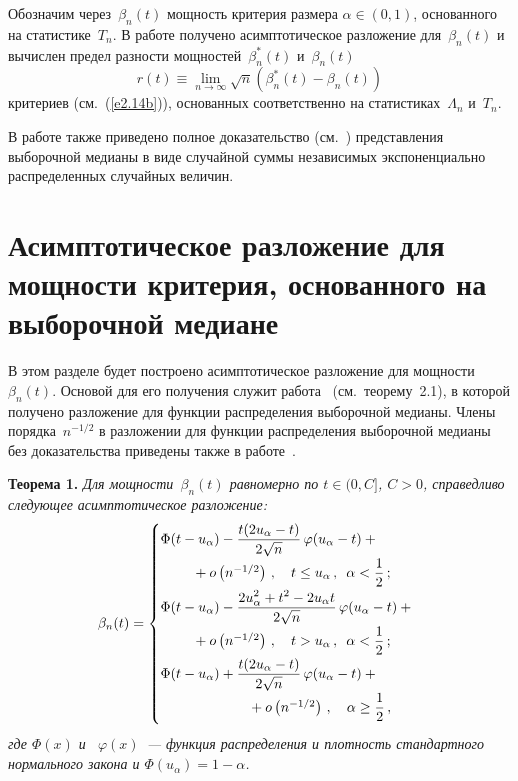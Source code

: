 \begin{multicols}{2}
Обозначим через~$\beta_n(t)$ мощность критерия размера $\alpha\in (0,1)$,
основанного на статистике~$T_n$. В работе получено асимптотическое
разложение для~$\beta_n(t)$ и вычислен предел разности мощностей~$\beta_n^*(t)$ и~$\beta_n(t)$
$$
r(t)\equiv\lim_{n\to\infty}\sqrt n\left(\beta_n^*(t)-\beta_n(t)\right)
$$
критериев (см.~(\ref{e2.14b})),
основанных соответственно на статистиках~$\Lambda_n$ и~$T_n$.

В работе также приведено полное доказательство  (см.~\cite{5ben})
представления выборочной медианы в виде случайной суммы
независимых экспоненциально распределенных  случайных величин.


\section{Асимптотическое разложение для мощности критерия,
основанного на выборочной медиане}

В этом разделе будет построено  асимптотическое разложение  для мощности~$\beta_n(t)$.
Основой для его получения служит  работа~\cite{1ben} (см.\ теорему~2.1),
в которой получено разложение для функции распределения выборочной медианы.
Члены порядка~$n^{-1/2}$ в разложении для функции распределения выборочной медианы
без доказательства приведены  также в работе~\cite{9ben}.

\medskip
\noindent
\textbf{Теорема 1.} {\it Для мощности~$\beta_n(t)$ равномерно по
$t\in(0,C]$, $C>0$,
справедливо следующее асимптотическое разложение:
\begin{equation*}
\beta_n(t)=
\begin{cases}
\Phi(t-u_\alpha)-\fr{t(2u_\alpha-t)}{2\sqrt{n}}\,\varphi(u_\alpha-t)+{} \\
\hspace*{8mm}{}+o\left(n^{-1/2}\right)\,,  \quad t \le u_\alpha\,,\enskip  \alpha <\fr{1}{2}\,;\\
\Phi(t-u_\alpha)-\fr{2u_\alpha^2+t^2-2u_\alpha t}{2\sqrt{n}}\,\varphi(u_\alpha -t)+{}\\
\hspace*{8mm}{}+o\left(n^{-1/2}\right)\,, \quad t>u_\alpha\,, \enskip \alpha <\fr{1}{2}\,;\\
\Phi(t-u_\alpha)+\fr{t(2u_\alpha-t)}{2\sqrt{n}}\,\varphi(u_\alpha -t)+{}\\
\hspace*{22mm}{}+{} o\left(n^{-1/2}\right)\,, \quad 
\alpha \ge \fr{1}{2}\,,
\end{cases}\hspace*{-6pt}
\end{equation*}
где  $\Phi(x)$  и~ $\varphi(x)$~---  функция распределения и
плотность стандартного нормального закона и $\Phi(u_\alpha)=1-\alpha$.}


\end{multicols}
